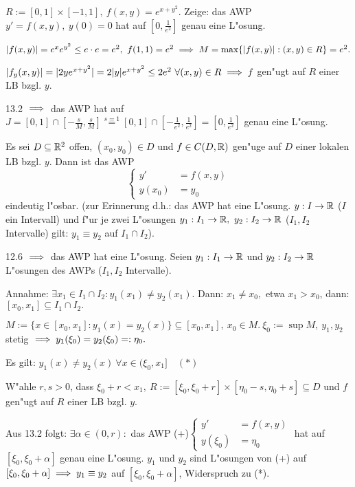 \documentclass[a4paper,twoside,DIV15,BCOR12mm]{scrbook}
\begin{document}
\begin{beispiel}
$R:=[0,1]\times[-1,1],\ f(x,y)=e^{x+y^2}.$ Zeige: das AWP $y'=f(x,y),\ y(0)=0$ hat auf $[0,\frac{1}{e^2}]$ genau eine L"osung.
\end{beispiel}

\begin{beweis}
$|f(x,y)| = e^xe^{y^2} \le e\cdot e=e^2,\ f(1,1) = e^2 \folgt M=\max\{|f(x,y)|:(x,y)\in R\} = e^2.$

$|f_y(x,y)| = |2y e^{x+y^2}| = 2|y|e^{x+y^2}\le 2 e^2\ \forall (x,y)\in R \implies f$ gen"ugt auf $R$ einer LB bzgl. $y$.

13.2 $\implies$ das AWP hat auf $J=[0,1]\cap[-\frac{s}{M},\frac{s}{M}] \overset{s=1}{=} [0,1]\cap[-\frac{1}{e^2},\frac{1}{e^2}] = [0,\frac{1}{e^2}]$ genau eine L"osung.
\end{beweis}

\begin{satz}
Es sei $D\subseteq\mathbb{R}^2$ offen, $(x_0,y_0)\in D$ und $f\in C(D,\mathbb{R})$ gen"uge auf $D$ einer lokalen LB bzgl. $y$. Dann ist das AWP
$$\begin{cases}
y'    &=f(x,y)\\
y(x_0)&=y_0
\end{cases}$$
eindeutig l"osbar. (zur Erinnerung d.h.: das AWP hat eine L"osung. $y:I\to\mathbb{R}$ ($I$ ein Intervall) und f"ur je zwei L"osungen $y_1:I_1\to\mathbb{R},\ y_2:I_2\to\mathbb{R}$ ($I_1,I_2$ Intervalle) gilt: $y_1 \equiv y_2$ auf $I_1\cap I_2$).
\end{satz}

\begin{beweis}
12.6 $\implies$ das AWP hat eine L"osung. Seien $y_1:I_1\to\mathbb{R}$ und $y_2:I_2\to\mathbb{R}$ L"osungen des AWPs ($I_1,I_2$ Intervalle).

Annahme: $\exists x_1\in I_1\cap I_2: y_1(x_1)\ne y_2(x_1).$ Dann: $x_1 \ne x_0,$ etwa $x_1>x_0$, dann: $[x_0,x_1]\subseteq I_1\cap I_2.$

$M:=\{x\in[x_0,x_1]:y_1(x)=y_2(x)\}\subseteq [x_0,x_1],\ x_0\in M.\ \xi_0:=\sup M,\ y_1,y_2$ stetig $\implies y_1(\xi_0) = y_2(\xi_0) =:\eta_0.$

Es gilt: $y_1(x) \ne y_2(x)\ \forall x\in(\xi_0,x_1]\quad (*)$

W"ahle $r,s>0$, dass $\xi_0+r<x_1,\ R:=[\xi_0,\xi_0+r]\times[\eta_0-s,\eta_0+s]\subseteq D$ und $f$ gen"ugt auf $R$ einer LB bzgl. $y$.

Aus 13.2 folgt: $\exists \alpha\in(0,r):$ das AWP (+)$\begin{cases}
y'       &=f(x,y)\\
y(\xi_0) &=\eta_0
\end{cases}$ hat auf $[\xi_0,\xi_0+\alpha]$ genau eine L"osung. $y_1$ und $y_2$ sind L"osungen von (+) auf $[\xi_0,\xi_0+\alpha] \implies y_1 \equiv y_2$ auf $[\xi_0,\xi_0+\alpha]$, Widerspruch zu (*).
\end{beweis}
\end{document}
